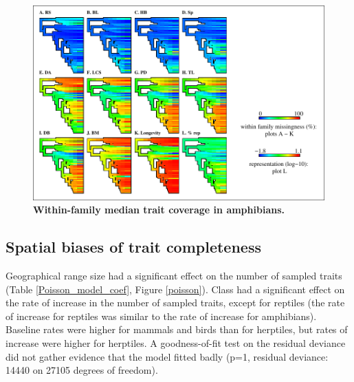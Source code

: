 \begin{figure}[h!]
\centering
\includegraphics[scale=1]{figures/chapter2/NA_phylo_patterns/Amphibians_coverage}
\caption[Within-family median trait coverage in amphibians]{\textbf{Within-family median trait coverage in amphibians.}}
\label{familycov_amphibians}
\end{figure}

\pagebreak


\subsection{Spatial biases of trait completeness} 
Geographical range size had a significant effect on the number of sampled traits (Table \ref{Poisson_model_coef}, Figure \ref{poisson}). Class had a significant effect on the rate of increase in the number of sampled traits, except for reptiles (the rate of increase for reptiles was similar to the rate of increase for amphibians). Baseline rates were higher for mammals and birds than for herptiles, but rates of increase were higher for herptiles.
A goodness-of-fit test on the residual deviance did not gather evidence that the model fitted badly (p=1, residual deviance: 14440 on 27105 degrees of freedom).

